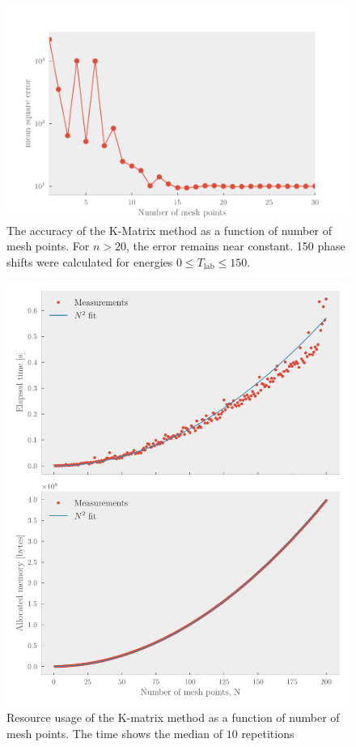 \begin{figure}[ht]
  \centering
  \includegraphics[]{Figures/kmatrix_accuracy}
  \caption{\label{fig:kmatrix_accuracy} The accuracy of the K-Matrix method as a
  function of number of mesh points. For \(n>20\), the error remains near
  constant. 150 phase shifts were calculated for energies \(0\le T_{\text{lab}} \le 150\).}
\end{figure}

\begin{figure}[ht]
  \centering
  \includegraphics[]{Figures/kmatrix_measurements.pdf}
  \caption{\label{fig:kmatrix_measurements} Resource usage of the K-matrix
    method as a function of number of mesh points. The time shows the median of
    \(10\) repetitions}
\end{figure}



